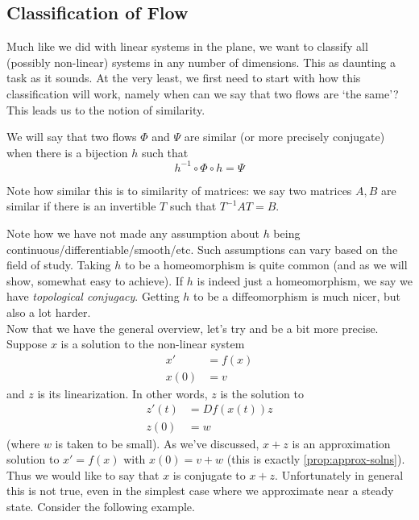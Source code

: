 \subsection{Classification of Flow}
Much like we did with linear systems in the plane, we want to classify all (possibly non-linear) systems in any number of dimensions. This as daunting a task as it sounds. At the very least, we first need to start with how this classification will work, namely when can we say that two flows are `the same'? This leads us to the notion of similarity.

We will say that two flows $\Phi$ and $\Psi$ are similar (or more precisely conjugate) when there is a bijection $h$ such that
$$ h^{-1} \circ \Phi \circ h = \Psi$$
\begin{remark}
    Note how similar this is to similarity of matrices: we say two matrices $A, B$ are similar if there is an invertible $T$ such that $T^{-1}AT = B$.
\end{remark}
Note how we have not made any assumption about $h$ being continuous/differentiable/smooth/etc. Such assumptions can vary based on the field of study. Taking $h$ to be a homeomorphism is quite common (and as we will show, somewhat easy to achieve). If $h$ is indeed just a homeomorphism, we say we have \textit{topological conjugacy}. Getting $h$ to be a diffeomorphism is much nicer, but also a lot harder.\\

Now that we have the general overview, let's try and be a bit more precise. Suppose $x$ is a solution to the non-linear system
\begin{align*}
    x' &= f(x)\\
    x(0) &= v
\end{align*}
and $z$ is its linearization. In other words, $z$ is the solution to
\begin{align*}
    z'(t) &= Df(x(t)) z\\
    z(0) &= w
\end{align*}
(where $w$ is taken to be small). 
As we've discussed, $x + z$ is an approximation solution to $x' = f(x)$ with $x(0) = v + w$ (this is exactly \autoref{prop:approx-solns}). Thus we would like to say that $x$ is conjugate to $x + z$. Unfortunately in general this is not true, even in the simplest case where we approximate near a steady state. Consider the following example.

